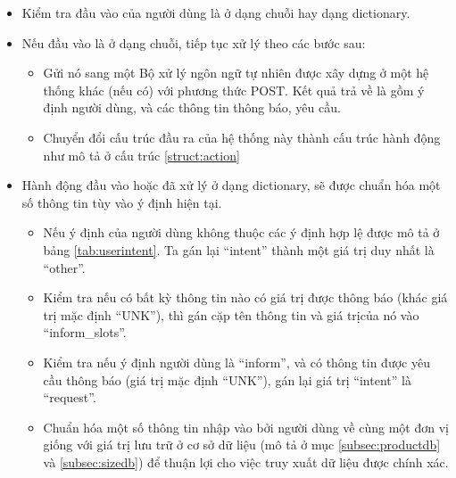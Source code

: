 \begin{itemize}
    \item Kiểm tra đầu vào của người dùng là ở dạng chuỗi hay dạng dictionary.
    \item Nếu đầu vào là ở dạng chuỗi, tiếp tục xử lý theo các bước sau:
    \begin{itemize}
        \item Gửi nó sang một Bộ xử lý ngôn ngữ tự nhiên được xây dựng
        ở một hệ thống khác (nếu có) với phương thức POST. Kết quả
        trả về là gồm ý định người dùng, và các thông tin thông báo, yêu cầu.
        \item Chuyển đổi cấu trúc đầu ra của hệ thống này thành cấu trúc
        hành động như mô tả ở cấu trúc \ref{struct:action}
    \end{itemize}
    \item Hành động đầu vào hoặc đã xử lý ở dạng dictionary, sẽ được
    chuẩn hóa một số thông tin tùy vào ý định hiện tại.
    \begin{itemize}
        \item Nếu ý định của người dùng không thuộc các ý định hợp lệ
        được mô tả ở bảng \ref{tab:userintent}. Ta gán lại \enquote{intent}
        thành một giá trị duy nhất là \enquote{other}.
        \item Kiểm tra nếu có bất kỳ thông tin nào có giá trị được thông báo
        (khác giá trị mặc định \enquote{UNK}), thì gán cặp tên thông tin
        và giá trịcủa nó vào \enquote{inform\_slots}.
        \item Kiểm tra nếu ý định người dùng là \enquote{inform}, và có
        thông tin được yêu cầu thông báo (giá trị mặc định \enquote{UNK}),
        gán lại giá trị \enquote{intent} là \enquote{request}.
        \item Chuẩn hóa một số thông tin nhập vào bởi người dùng về cùng
        một đơn vị giống với giá trị lưu trữ ở cơ sở dữ liệu (mô tả ở mục
        \ref{subsec:productdb} và \ref{subsec:sizedb}) để thuận lợi
        cho việc truy xuất dữ liệu được chính xác.
    \end{itemize}
\end{itemize}


